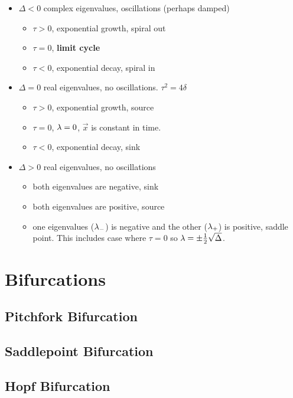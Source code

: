 \begin{itemize}
\item $\Delta < 0$
complex eigenvalues,
oscillations (perhaps damped)
\begin{itemize}[\checkmark]
\item $\tau>0$, exponential growth, spiral out
\item $\tau=0$, {\bf limit cycle}
\item $\tau<0$, exponential decay, spiral in
\end{itemize}


\item $\Delta = 0$
real eigenvalues,
no oscillations. $\tau^2 = 4\delta$
\begin{itemize}[\checkmark]
\item $\tau>0$, exponential growth, source
\item $\tau=0$, $\lambda=0$, $\vec{x}$ is constant in time.
\item $\tau<0$, exponential decay, sink
\end{itemize}

\item $\Delta > 0$
real eigenvalues,
no oscillations 

\begin{itemize}[\checkmark]
\item both eigenvalues are negative, sink
\item both eigenvalues are positive, source
\item one eigenvalues ($\lambda_-$) is negative 
and the other ($\lambda_+$) is positive, saddle point. This 
includes case where $\tau=0$ so $\lambda =\pm\frac{1}{2}\sqrt{\Delta}$.
\end{itemize}
\end{itemize}
\section{Bifurcations}
\subsection{Pitchfork Bifurcation}
\subsection{Saddlepoint Bifurcation}
\subsection{Hopf Bifurcation}